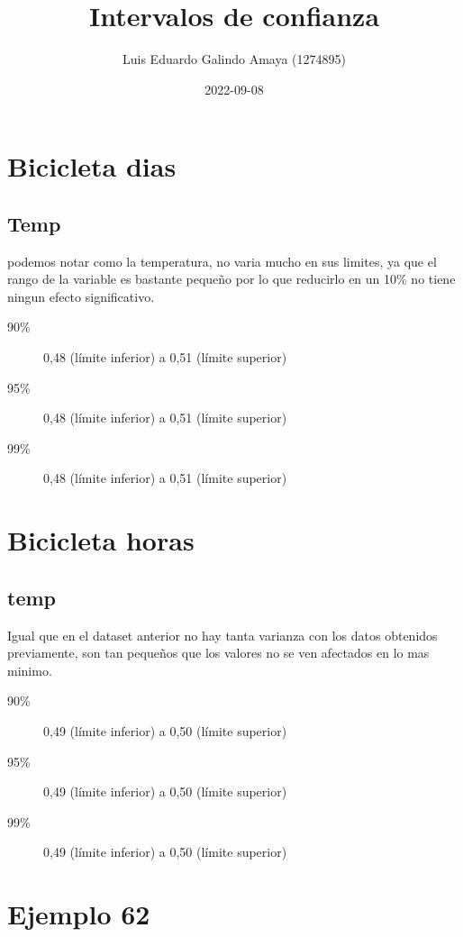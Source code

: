 \documentclass[11pt]{article}
\author{Luis Eduardo Galindo Amaya (1274895)}
\date{2022-09-08}
\title{Intervalos de confianza}
\begin{document}
\maketitle
\tableofcontents


\section{Bicicleta dias}
\label{sec:org33b570b}
\subsection{Temp}
\label{sec:orgb74d293}
podemos notar como la temperatura, no varia mucho en sus limites, ya que el rango de la variable es bastante pequeño por lo que reducirlo en un 10\% no tiene ningun efecto significativo.

\begin{description}
\item[{90\%}] 0,48 (límite inferior) a 0,51 (límite superior)
\item[{95\%}] 0,48 (límite inferior) a 0,51 (límite superior)
\item[{99\%}] 0,48 (límite inferior) a 0,51 (límite superior)
\end{description}

\section{Bicicleta horas}
\label{sec:org2654fc8}
\subsection{temp}
\label{sec:org49729b7}
Igual que en el dataset anterior no hay tanta varianza con los datos obtenidos previamente, son tan pequeños que los valores no se ven afectados en lo mas minimo.

\begin{description}
\item[{90\%}] 0,49 (límite inferior) a 0,50 (límite superior)
\item[{95\%}] 0,49 (límite inferior) a 0,50 (límite superior)
\item[{99\%}] 0,49 (límite inferior) a 0,50 (límite superior)
\end{description}

\section{Ejemplo 62}
\label{sec:orgb417538}
\end{document}
